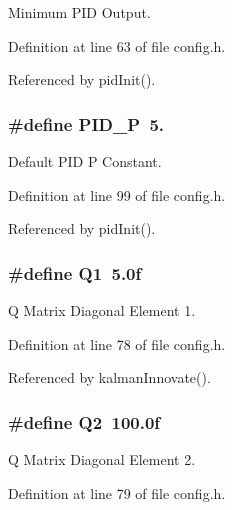 Minimum P\-I\-D Output. 



Definition at line 63 of file config.\-h.



Referenced by pid\-Init().

\hypertarget{group__config_gab3ea7c9a4399d8844727806c960880ad}{
\subsubsection[{P\-I\-D\-\_\-\-P}]{\setlength{\rightskip}{0pt plus 5cm}\#define P\-I\-D\-\_\-\-P~5.}}\label{group__config_gab3ea7c9a4399d8844727806c960880ad}


Default P\-I\-D P Constant. 



Definition at line 99 of file config.\-h.



Referenced by pid\-Init().

\hypertarget{group__config_ga0f32727853a3ac3d848701803c3b8688}{
\subsubsection[{Q1}]{\setlength{\rightskip}{0pt plus 5cm}\#define Q1~5.\-0f}}\label{group__config_ga0f32727853a3ac3d848701803c3b8688}


Q Matrix Diagonal Element 1. 



Definition at line 78 of file config.\-h.



Referenced by kalman\-Innovate().

\hypertarget{group__config_gaf5bca4c32f8c6886a3d8c526d2e3e9a7}{
\subsubsection[{Q2}]{\setlength{\rightskip}{0pt plus 5cm}\#define Q2~100.\-0f}}\label{group__config_gaf5bca4c32f8c6886a3d8c526d2e3e9a7}


Q Matrix Diagonal Element 2. 



Definition at line 79 of file config.\-h.



